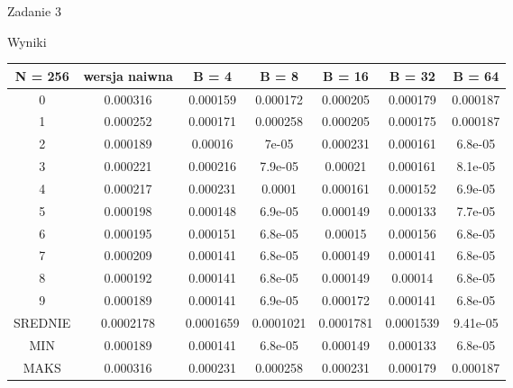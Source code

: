 \documentclass[11pt,wide]{mwart}
\begin{document}
\begin{section}{Zadanie 3}
\begin{subsection}{Wyniki}
\begin{center}
\begin{tabular}{|c|c|c|c|c|c|c|}
\hline
N = 256 & wersja naiwna & B = 4 & B = 8 & B = 16 & B = 32 & B = 64\\
\hline
0 & 0.000316 & 0.000159 & 0.000172 & 0.000205 & 0.000179 & 0.000187\\
\hline
1 & 0.000252 & 0.000171 & 0.000258 & 0.000205 & 0.000175 & 0.000187\\
\hline
2 & 0.000189 & 0.00016 & 7e-05 & 0.000231 & 0.000161 & 6.8e-05\\
\hline
3 & 0.000221 & 0.000216 & 7.9e-05 & 0.00021 & 0.000161 & 8.1e-05\\
\hline
4 & 0.000217 & 0.000231 & 0.0001 & 0.000161 & 0.000152 & 6.9e-05\\
\hline
5 & 0.000198 & 0.000148 & 6.9e-05 & 0.000149 & 0.000133 & 7.7e-05\\
\hline
6 & 0.000195 & 0.000151 & 6.8e-05 & 0.00015 & 0.000156 & 6.8e-05\\
\hline
7 & 0.000209 & 0.000141 & 6.8e-05 & 0.000149 & 0.000141 & 6.8e-05\\
\hline
8 & 0.000192 & 0.000141 & 6.8e-05 & 0.000149 & 0.00014 & 6.8e-05\\
\hline
9 & 0.000189 & 0.000141 & 6.9e-05 & 0.000172 & 0.000141 & 6.8e-05\\
\hline
SREDNIE & 0.0002178 & 0.0001659 & 0.0001021 & 0.0001781 & 0.0001539 & 9.41e-05\\
\hline
MIN & 0.000189 & 0.000141 & 6.8e-05 & 0.000149 & 0.000133 & 6.8e-05\\
\hline
MAKS & 0.000316 & 0.000231 & 0.000258 & 0.000231 & 0.000179 & 0.000187\\
\hline
\end{tabular}
\end{center}



\end{subsection}
\end{section}
\end{document}
